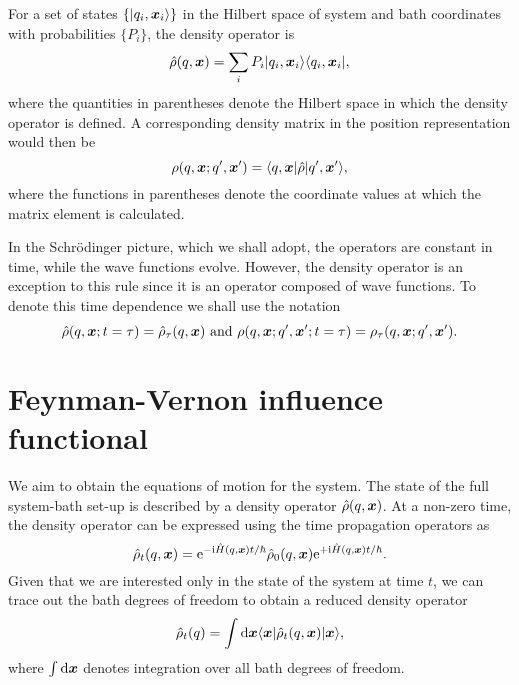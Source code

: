 For a set of states $\{|q_i,\bm{x}_i\rangle\}$ in the Hilbert space of system and bath coordinates with probabilities $\{P_i\}$, the density operator is
\begin{equation}
	\hat{\rho}(q,\bm{x}) = \sum_i P_i|q_i,\bm{x}_i\rangle\langle q_i,\bm{x}_i|,
\end{equation}
where the quantities in parentheses denote the Hilbert space in which the density operator is defined. A corresponding density matrix in the position representation would then be
\begin{equation}
	\rho(q,\bm{x};q',\bm{x}') = \langle q,\bm{x}|\hat{\rho}|q',\bm{x}'\rangle,
\end{equation}
where the functions in parentheses denote the coordinate values at which the matrix element is calculated.

In the Schr\"odinger picture, which we shall adopt, the operators are constant in time, while the wave functions evolve. However, the density operator is an exception to this rule since it is an operator composed of wave functions. To denote this time dependence we shall use the notation
\begin{equation}
	\hat{\rho}(q,\bm{x};t=\tau) = \hat{\rho}_\tau(q,\bm{x})\text{ and }
	\rho(q,\bm{x};q',\bm{x}';t=\tau)=\rho_\tau(q,\bm{x};q',\bm{x}').
\end{equation}
\section{Feynman-Vernon influence functional}\label{sec:feynman_vernon_functional}
We aim to obtain the equations of motion for the system. The state of the full system-bath set-up is described by a density operator $\hat{\rho}(q,\bm{x})$. At a non-zero time, the density operator can be expressed using the time propagation operators as%
\begin{equation}
	\hat{\rho}_t(q,\bm{x}) = \mathrm{e}^{-\mathrm{i}\hat{H}(q,\bm{x})t/\hbar} \hat{\rho}_0(q,\bm{x}) \mathrm{e}^{+\mathrm{i}\hat{H}(q,\bm{x})t/\hbar}.
\end{equation}
Given that we are interested only in the state of the system at time $t$, we can trace out the bath degrees of freedom to obtain a reduced density operator
\begin{equation}
	\hat{\rho}_t(q) = \int \mathrm{d}\bm{x}\langle\bm{x}|\hat{\rho}_t(q,\bm{x}) |\bm{x}\rangle,
\end{equation}
where $\int \mathrm{d}\bm{x}$ denotes integration over all bath degrees of freedom.

